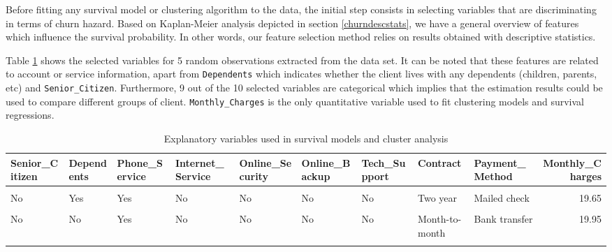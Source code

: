\documentclass[
]{book}
\begin{document}
Before fitting any survival model or clustering algorithm to the data, the initial step consists in selecting variables that are discriminating in terms of churn hazard. Based on Kaplan-Meier analysis depicted in section \ref{churndescstats}, we have a general overview of features which influence the survival probability. In other words, our feature selection method relies on results obtained with descriptive statistics.

Table \ref{tab:selectedfeatures} shows the selected variables for 5 random observations extracted from the data set. It can be noted that these features are related to account or service information, apart from \texttt{Dependents} which indicates whether the client lives with any dependents (children, parents, etc) and \texttt{Senior\_Citizen}. Furthermore, 9 out of the 10 selected variables are categorical which implies that the estimation results could be used to compare different groups of client. \texttt{Monthly\_Charges} is the only quantitative variable used to fit clustering models and survival regressions.

\begin{table}[H]

\caption{\label{tab:selectedfeatures}Explanatory variables used in survival models and cluster analysis}
\centering
\begin{tabular}[t]{lllllllllr}
\toprule
Senior\_Citizen & Dependents & Phone\_Service & Internet\_Service & Online\_Security & Online\_Backup & Tech\_Support & Contract & Payment\_Method & Monthly\_Charges\\
\midrule
\cellcolor{gray!6}{Yes} & \cellcolor{gray!6}{No} & \cellcolor{gray!6}{Yes} & \cellcolor{gray!6}{DSL} & \cellcolor{gray!6}{No} & \cellcolor{gray!6}{Yes} & \cellcolor{gray!6}{No} & \cellcolor{gray!6}{Month-to-month} & \cellcolor{gray!6}{Bank transfer} & \cellcolor{gray!6}{50.40}\\
No & Yes & Yes & No & No & No & No & Two year & Mailed check & 19.65\\
\cellcolor{gray!6}{No} & \cellcolor{gray!6}{Yes} & \cellcolor{gray!6}{Yes} & \cellcolor{gray!6}{Fiber optic} & \cellcolor{gray!6}{Yes} & \cellcolor{gray!6}{Yes} & \cellcolor{gray!6}{Yes} & \cellcolor{gray!6}{Two year} & \cellcolor{gray!6}{Credit card} & \cellcolor{gray!6}{114.30}\\
No & No & Yes & No & No & No & No & Month-to-month & Bank transfer & 19.95\\
\cellcolor{gray!6}{No} & \cellcolor{gray!6}{No} & \cellcolor{gray!6}{Yes} & \cellcolor{gray!6}{DSL} & \cellcolor{gray!6}{Yes} & \cellcolor{gray!6}{No} & \cellcolor{gray!6}{Yes} & \cellcolor{gray!6}{Month-to-month} & \cellcolor{gray!6}{Mailed check} & \cellcolor{gray!6}{54.45}\\
\bottomrule
\end{tabular}
\end{table}
\end{document}
